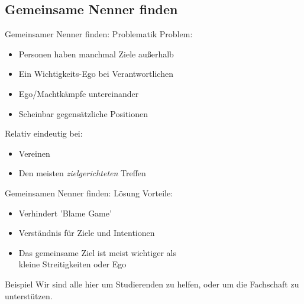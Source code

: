 \subsection{Gemeinsame Nenner finden}
\begin{frame}[c]{Gemeinsamer Nenner finden: Problematik}
    \large
    Problem:
    \begin{itemize}[<+(1)->]
        \item Personen haben manchmal Ziele außerhalb
        \item Ein Wichtigkeits-Ego bei Verantwortlichen
        \item Ego/Machtkämpfe untereinander
        \item Scheinbar gegensätzliche Positionen
    \end{itemize}
    \pause
    Relativ eindeutig bei:
    \begin{itemize}[<+(1)->]
        \item Vereinen
        \item Den meisten {\em zielgerichteten} Treffen
    \end{itemize}
\end{frame}

\begin{frame}[c]{Gemeinsamen Nenner finden: Lösung}
    \large
    Vorteile:
    \begin{itemize}[<+(1)->]
        \item Verhindert 'Blame Game'
        \item Verständnis für Ziele und Intentionen
        \item Das gemeinsame Ziel ist meist wichtiger als \\kleine Streitigkeiten oder Ego
    \end{itemize}
    \vspace{1cm}

    \pause
    \begin{block}{Beispiel}
        Wir sind alle hier um Studierenden zu helfen, oder 
        um die Fachschaft zu unterstützen.
    \end{block}
\end{frame}
